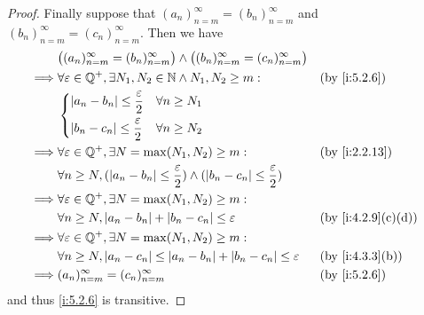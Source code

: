 \begin{proof}
  Finally suppose that \((a_n)_{n = m}^\infty = (b_n)_{n = m}^\infty\) and \((b_n)_{n = m}^\infty = (c_n)_{n = m}^\infty\).
  Then we have
  \begin{align*}
             & \big((a_n)_{n = m}^\infty = (b_n)_{n = m}^\infty\big) \land \big((b_n)_{n = m}^\infty = (c_n)_{n = m}^\infty\big)                          \\
    \implies & \forall \varepsilon \in \Q^+, \exists N_1, N_2 \in \N \land N_1, N_2 \geq m:                                        &  & \by{i:5.2.6}      \\
             & \begin{dcases}
                 \abs{a_n - b_n} \leq \dfrac{\varepsilon}{2} & \forall n \geq N_1 \\
                 \abs{b_n - c_n} \leq \dfrac{\varepsilon}{2} & \forall n \geq N_2 \\
               \end{dcases}                                                                           \\
    \implies & \forall \varepsilon \in \Q^+, \exists N = \max(N_1, N_2) \geq m:                                                    &  & \by{i:2.2.13}     \\
             & \forall n \geq N, (\abs{a_n - b_n} \leq \dfrac{\varepsilon}{2}) \land (\abs{b_n - c_n} \leq \dfrac{\varepsilon}{2})                        \\
    \implies & \forall \varepsilon \in \Q^+, \exists N = \max(N_1, N_2) \geq m:                                                                           \\
             & \forall n \geq N, \abs{a_n - b_n} + \abs{b_n - c_n} \leq \varepsilon                                                &  & \by{i:4.2.9}[c,d] \\
    \implies & \forall \varepsilon \in \Q^+, \exists N = \max(N_1, N_2) \geq m:                                                                           \\
             & \forall n \geq N, \abs{a_n - c_n} \leq \abs{a_n - b_n} + \abs{b_n - c_n} \leq \varepsilon                           &  & \by{i:4.3.3}[b]   \\
    \implies & (a_n)_{n = m}^\infty = (c_n)_{n = m}^\infty                                                                         &  & \by{i:5.2.6}
  \end{align*}
  and thus \cref{i:5.2.6} is transitive.
\end{proof}

